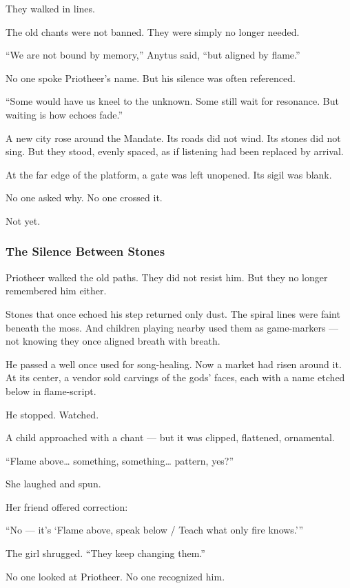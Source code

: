 \documentclass[12pt]{article}
\begin{document}
They walked in lines.

The old chants were not banned.  
They were simply no longer needed.

 “We are not bound by memory,” Anytus said,  
 “but aligned by flame.”

No one spoke Priotheer’s name.  
But his silence was often referenced.

 “Some would have us kneel to the unknown.  
 Some still wait for resonance.  
 But waiting is how echoes fade.”

A new city rose around the Mandate.  
Its roads did not wind.  
Its stones did not sing.  
But they stood, evenly spaced, as if listening had been replaced by arrival.

At the far edge of the platform, a gate was left unopened.  
Its sigil was blank.

No one asked why.  
No one crossed it.

Not yet.


\dotfill

\subsubsection*{The Silence Between Stones}

Priotheer walked the old paths.  
They did not resist him.  
But they no longer remembered him either.

Stones that once echoed his step returned only dust.  
The spiral lines were faint beneath the moss.  
And children playing nearby used them as game-markers —  
not knowing they once aligned breath with breath.

He passed a well once used for song-healing.  
Now a market had risen around it.  
At its center, a vendor sold carvings of the gods’ faces,  
each with a name etched below in flame-script.

He stopped.  
Watched.

A child approached with a chant —  
but it was clipped, flattened, ornamental.

 “Flame above… something, something… pattern, yes?”

She laughed and spun.

Her friend offered correction:

 “No — it’s ‘Flame above, speak below / Teach what only fire knows.’”

The girl shrugged.  
 “They keep changing them.”

No one looked at Priotheer.  
No one recognized him.
\end{document}
